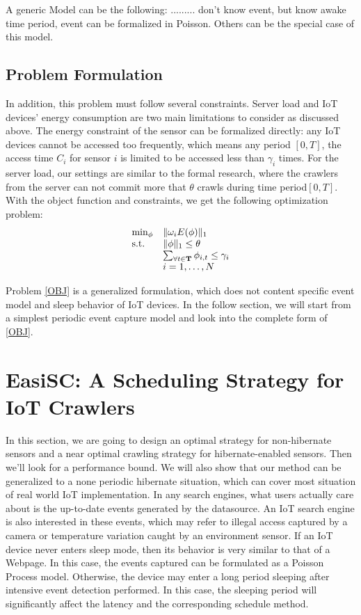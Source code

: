 \documentclass[conference]{IEEEtran}
\begin{document}
A generic Model can be the following: .........
don't know event, but know awake time period, event can be formalized in Poisson. 
Others can be the special case of this model.

\subsection{Problem Formulation}

In addition, this problem must follow several constraints. Server load and IoT devices' energy consumption are two main limitations to consider as discussed above. 
The energy constraint of the sensor can be formalized directly: any IoT devices cannot be accessed too frequently, which means any period $[0, T]$, the access time $C_i$ for sensor $i$ is limited to be accessed less than $\gamma_i$ times. For the server load, our settings are similar to the formal research\cite{Wolf2002}, where the crawlers from the server can not commit more that $\theta$ crawls during time period$[0, T]$.
With the object function and constraints, we get the following optimization problem:
\begin{eqnarray}
\begin{array}{ll}
\min_{\phi}&\Arrowvert \omega_i E(\phi) \Arrowvert_{1}\\
\text{s.t.}
&\Arrowvert \phi \Arrowvert_{1}\leq\theta\\
&\sum_{\forall t \in \mathbf{T}}{\phi_{i,t}}\leq\gamma_i\\
&i=1,\ldots,N
\end{array}\label{OBJ}
\end{eqnarray}


Problem \eqref{OBJ} is a generalized formulation, which does not content specific event model and sleep behavior of IoT devices. In the follow section, we will start from a simplest periodic event capture model and look into the complete form of \eqref{OBJ}.

\section{EasiSC: A Scheduling Strategy for\\IoT Crawlers}

In this section, we are going to design an optimal strategy for non-hibernate sensors and a near optimal crawling strategy for hibernate-enabled sensors. Then we'll look for a performance bound. We will also show that our method can be generalized to a none periodic hibernate situation, which can cover most situation of real world IoT implementation. In any search engines, what users actually care about is the up-to-date events generated by the datasource. An IoT search engine is also interested in these events, which may refer to illegal access captured by a camera or temperature variation caught by an environment sensor. If an IoT device never enters sleep mode, then its behavior is very similar to that of a Webpage. In this case, the events captured can be formulated as a Poisson Process model\cite{Cho2000}. Otherwise, the device may enter a long period sleeping after intensive event detection performed. In this case, the sleeping period will significantly affect the latency and the corresponding schedule method.
\end{document}
